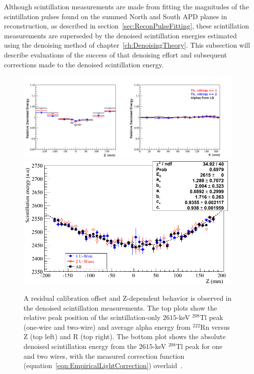 Although scintillation measurements are made from fitting the magnitudes of the scintillation pulses found on the summed North and South APD planes in reconstruction, as described in section~\ref{sec:ReconPulseFitting}, these scintillation measurements are superseded by the denoised scintillation energies estimated using the denoising method of chapter~\ref{ch:DenoisingTheory}.  This subsection will describe evaluations of the success of that denoising effort and subsequent corrections made to the denoised scintillation energy.

\begin{figure}
\begin{center}
\includegraphics[keepaspectratio=true,width=\textwidth,clip=true,trim=0mm 0mm 20mm 0mm]{DenoisedScintillatonRelativeRZBias.png}
\includegraphics[keepaspectratio=true,width=\textwidth]{DenoisedScintillatonZBias.png}
\end{center}
\renewcommand{\baselinestretch}{1}
\small\normalsize
\begin{quote}
\caption{A residual calibration offset and Z-dependent behavior is observed in the denoised scintillation measurements.  The top plots show the relative peak position of the scintillation-only $2615$-keV $^{208}$Tl peak (one-wire and two-wire) and average alpha energy from $^{222}$Rn versus Z (top left) and R (top right).  The bottom plot shows the absolute denoised scintillation energy from the $2615$-keV $^{208}$Tl peak for one and two wires, with the measured correction function (equation~\ref{eqn:EmpiricalLightCorrection}) overlaid~\cite{EnergyDocumentRun2ab}.}
\label{fig:ResidualLightZBias}
\end{quote}
\end{figure}
\renewcommand{\baselinestretch}{2}
\small\normalsize

